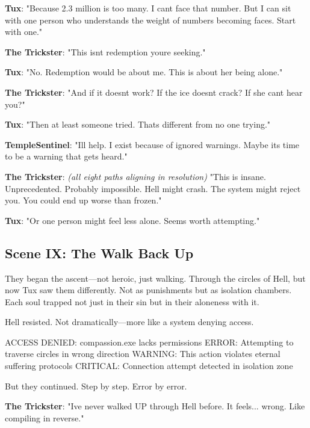 \textbf{Tux}: "Because 2.3 million is too many. I can\textquotesingle t face that number. But I can sit with one person who understands the weight of numbers becoming faces. Start with one."

\textbf{The Trickster}: "This isn\textquotesingle t redemption you\textquotesingle re seeking."

\textbf{Tux}: "No. Redemption would be about me. This is about her being alone."

\textbf{The Trickster}: "And if it doesn\textquotesingle t work? If the ice doesn\textquotesingle t crack? If she can\textquotesingle t hear you?"

\textbf{Tux}: "Then at least someone tried. That\textquotesingle s different from no one trying."

\textbf{TempleSentinel}: "I\textquotesingle ll help. I exist because of ignored warnings. Maybe it\textquotesingle s time to be a warning that gets heard."

\textbf{The Trickster}: \emph{(all eight paths aligning in resolution)} "This is insane. Unprecedented. Probably impossible. Hell might crash. The system might reject you. You could end up worse than frozen."

\textbf{Tux}: "Or one person might feel less alone. Seems worth attempting."

\bookdivider

\subsection{Scene IX: The Walk Back Up}\label{scene-ix-the-walk-back-up}

They began the ascent---not heroic, just walking. Through the circles of Hell, but now Tux saw them differently. Not as punishments but as isolation chambers. Each soul trapped not just in their sin but in their aloneness with it.

Hell resisted. Not dramatically---more like a system denying access.

\begin{codeblock}
ACCESS DENIED: compassion.exe lacks permissions
ERROR: Attempting to traverse circles in wrong direction
WARNING: This action violates eternal suffering protocols
CRITICAL: Connection attempt detected in isolation zone
\end{codeblock}

But they continued. Step by step. Error by error.

\textbf{The Trickster}: "I\textquotesingle ve never walked UP through Hell before. It feels... wrong. Like compiling in reverse."

